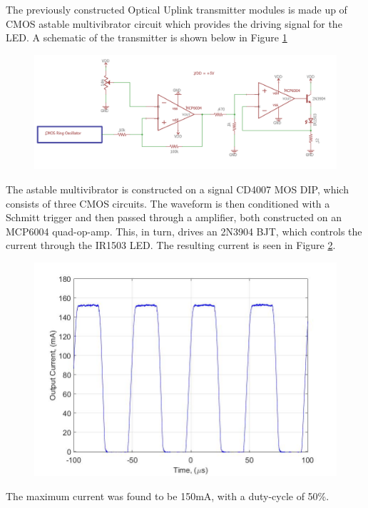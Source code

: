 

The previously constructed Optical Uplink transmitter modules is made up of CMOS astable multivibrator circuit which provides the driving signal for the LED. A schematic of the transmitter is shown below in Figure \ref{fig:finalexperimentalschem}

\begin{figure}[H]
	\centering
	\includegraphics[width=0.7\linewidth]{Preliminary_results/FINAlexperimentalSchem}
	\caption[Circuit schematic of transmitter]
	\label{fig:finalexperimentalschem}
\end{figure}

The astable multivibrator is constructed on a signal CD4007 MOS DIP, which consists of three CMOS circuits. The waveform is then conditioned with a Schmitt trigger and then passed through a amplifier, both constructed on an MCP6004 quad-op-amp. This, in turn, drives an 2N3904 BJT, which controls the current through the IR1503 LED. The resulting current is seen in Figure \ref{fig:expcurrentlab4}.

\begin{figure}[H]
	\centering
	\includegraphics[width=0.7\linewidth]{Preliminary_results/expcurrentlab4}
	\caption[Current through LED]
	\label{fig:expcurrentlab4}
\end{figure}

The maximum current was found to be 150mA, with a duty-cycle of 50\%. 


	

